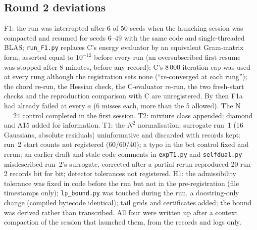 \subsection{Round 2 deviations}
F1: the run was interrupted after 6 of 50 seeds when the launching session was compacted and resumed for seeds 6--49 with the
same code and single-threaded BLAS; \texttt{run\_F1.py} replaces C's energy evaluator by an equivalent
Gram-matrix form, asserted equal to $10^{-12}$ before every run (an oversubscribed first resume was stopped after 8 minutes, before any record); C's 8\,000-iteration cap was used at every
rung although the registration sets none (``re-converged at each rung''); the chord re-run, the Hessian check, the C-evaluator re-run, the two fresh-start checks and the reproduction comparison with C are unregistered. By then F1a
had already failed at every $a$ (6 misses each, more than the 5 allowed). The N$=24$ control completed in the first session.
T2: mixture class appended; diamond and A15 added for information. T1: the $N^2$ normalisation; surrogate run~1 (16 Gaussians,
absolute residuals) uninformative and discarded with records kept; run~2 start counts not registered (60/60/40); a typo in the
bct control fixed and rerun; an earlier draft and stale code comments in \texttt{expT1.py} and \texttt{selfdual.py}
misdescribed run~2's surrogate, corrected after a partial rerun reproduced 20 run-2 records bit for bit; detector tolerances not
registered. H1: the admissibility tolerance was fixed in code before the run but not in the
pre-registration (file timestamps only); \texttt{lp\_bound.py} was touched during the run, a docstring-only change (compiled
bytecode identical); tail grids and certificates added; the bound was derived rather than transcribed. All four were written up after a context compaction of the session that
launched them, from the records and logs only.
